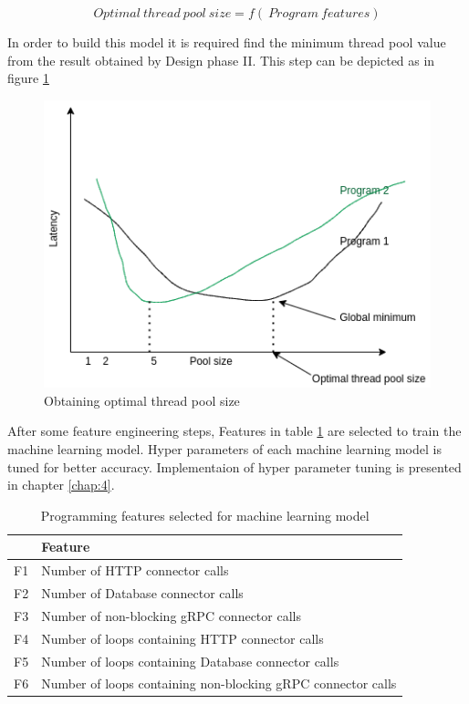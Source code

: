 $$ Optimal\:thread\:pool\:size = f(\:Program\:features)$$

In order to build this model it is required find the minimum thread pool value from the result obtained by Design phase II. This step can be depicted as in figure \ref{optimal_pool_size}

\begin{figure}[htbp]
	\begin{center}
		\includegraphics[scale=0.5]{figures/optimal_pool_size.png}
	\end{center}
	\caption{Obtaining optimal thread pool size}
	\label{optimal_pool_size}
\end{figure}

After some feature engineering steps, Features in table \ref{tab:programming-features}  are selected to train the machine learning model. Hyper parameters of each machine learning model is tuned for better accuracy. Implementaion of hyper parameter tuning is presented in chapter \ref{chap:4}.

\begin{table}[]
	\caption{Programming features selected for machine learning model}
	\label{tab:programming-features}
	\begin{tabular}{|l|l|}
		\hline
		& Feature                                                      \\ \hline
		F1 & Number of HTTP connector calls                               \\ \hline
		F2 & Number of Database connector calls                           \\ \hline
		F3 & Number of non-blocking gRPC connector calls                  \\ \hline
		F4 & Number of loops containing HTTP connector calls              \\ \hline
		F5 & Number of loops containing Database connector calls          \\ \hline
		F6 & Number of loops containing non-blocking gRPC connector calls \\ \hline
	\end{tabular}
\end{table}

